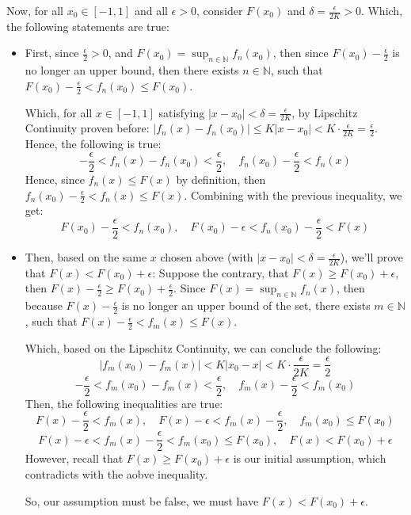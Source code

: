 \documentclass{article}
\begin{document}
Now, for all $x_0\in [-1,1]$ and all $\epsilon>0$, consider $F(x_0)$ and $\delta = \frac{\epsilon}{2K} >0$. Which, the following statements are true:
\begin{itemize}
    \item First, since $\frac{\epsilon}{2}>0$, and $F(x_0)=\sup_{n\in\mathbb{N}}f_n(x_0)$, then since $F(x_0)-\frac{\epsilon}{2}$ is no longer an upper bound,
    then there exists $n\in\mathbb{N}$, such that $F(x_0)-\frac{\epsilon}{2}<f_n(x_0)\leq F(x_0)$.

    Which, for all $x\in [-1,1]$ satisfying $|x-x_0|<\delta = \frac{\epsilon}{2K}$, by Lipschitz Continuity proven before:
    $|f_n(x)-f_n(x_0)|\leq K|x-x_0| < K\cdot \frac{\epsilon}{2K} = \frac{\epsilon}{2}$. Hence, the following is true:
    $$-\frac{\epsilon}{2}<f_n(x)-f_n(x_0)<\frac{\epsilon}{2},\quad f_n(x_0)-\frac{\epsilon}{2}<f_n(x)$$
    Hence, since $f_n(x)\leq F(x)$ by definition, then $f_n(x_0)-\frac{\epsilon}{2}<f_n(x)\leq F(x)$. Combining with the previous inequality, we get:
    $$F(x_0)-\frac{\epsilon}{2}<f_n(x_0),\quad F(x_0)-\epsilon < f_n(x_0)-\frac{\epsilon}{2}< F(x)$$

    \hfill

    \item Then, based on the same $x$ chosen above (with $|x-x_0|<\delta = \frac{\epsilon}{2K}$), we'll prove that $F(x)<F(x_0)+\epsilon$: Suppose the contrary, that $F(x)\geq F(x_0)+\epsilon$, then $F(x)-\frac{\epsilon}{2}\geq F(x_0)+\frac{\epsilon}{2}$.
    Since $F(x)=\sup_{n\in\mathbb{N}}f_n(x)$, then because $F(x)-\frac{\epsilon}{2}$ is no longer an upper bound of the set, there exists $m\in\mathbb{N}$, such that $F(x)-\frac{\epsilon}{2}<f_m(x)\leq F(x)$.

    Which, based on the Lipschitz Continuity, we can conclude the following:
    $$|f_m(x_0)-f_m(x)| < K|x_0-x| < K \cdot \frac{\epsilon}{2K} = \frac{\epsilon}{2}$$
    $$-\frac{\epsilon}{2}<f_m(x_0)-f_m(x)<\frac{\epsilon}{2},\quad f_m(x)-\frac{\epsilon}{2}<f_m(x_0)$$
    Then, the following inequalities are true:
    $$F(x)-\frac{\epsilon}{2}<f_m(x),\quad F(x)-\epsilon<f_m(x)-\frac{\epsilon}{2},\quad f_m(x_0)\leq F(x_0)$$
    $$F(x)-\epsilon < f_m(x)-\frac{\epsilon}{2}<f_m(x_0) \leq F(x_0),\quad F(x) < F(x_0)+\epsilon$$
    However, recall that $F(x)\geq F(x_0)+\epsilon$ is our initial assumption, which contradicts with the aobve inequality.

    So, our assumption must be false, we must have $F(x)<F(x_0)+\epsilon$.
\end{itemize}
\end{document}
